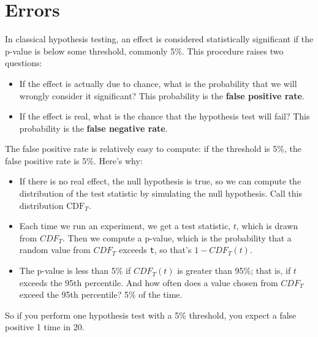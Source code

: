 \documentclass[12pt]{book}
\newcommand{\CDF}{\mathrm{CDF}}
\theoremstyle{exercise}
\begin{document}
\section{Errors}%

In classical hypothesis testing, an effect is considered statistically
significant if the p-value is below some threshold, commonly 5\%.
This procedure raises two questions:%
%
%
%

\begin{itemize}

\item If the effect is actually due to chance, what is the probability
that we will wrongly consider it significant?  This
probability is the {\bf false positive rate}.%

\item If the effect is real, what is the chance that the hypothesis
test will fail?  This probability is the {\bf false negative rate}.%

\end{itemize}

The false positive rate is relatively easy to compute: if the
threshold is 5\%, the false positive rate is 5\%.  Here's why:

\begin{itemize}

\item If there is no real effect, the null hypothesis is true, so we
  can compute the distribution of the test statistic by simulating the
  null hypothesis.  Call this distribution $\CDF_T$.%
%

\item Each time we run an experiment, we get a test statistic, $t$,
  which is drawn from $CDF_T$.  Then we compute a p-value, which is
  the probability that a random value from $CDF_T$ exceeds {\tt t},
  so that's $1 - CDF_T(t)$.

\item The p-value is less than 5\% if $CDF_T(t)$ is greater
  than 95\%; that is, if $t$ exceeds the 95th percentile.
  And how often does a value chosen from $CDF_T$ exceed
  the 95th percentile?  5\% of the time.

\end{itemize}

So if you perform one hypothesis test with a 5\% threshold, you expect
a false positive 1 time in 20.
\end{document}
